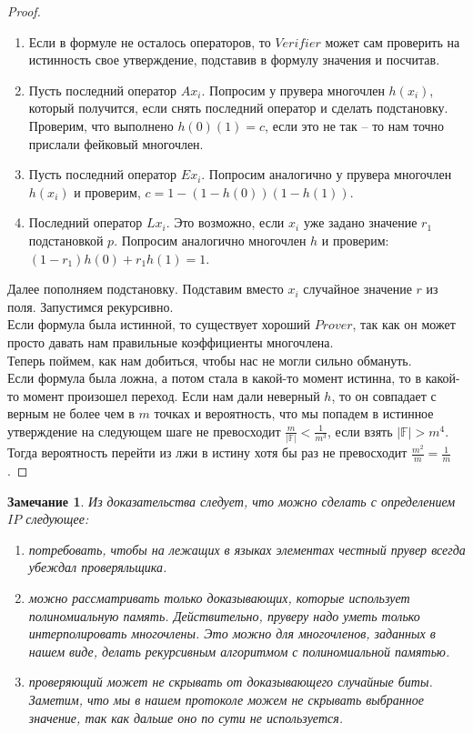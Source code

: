 \documentclass[12pt, letterpaper]{article}
\newtheorem{note}{Замечание}[section]
\newcommand{\Ff}{\mathbb{F}}
\begin{document}
\begin{proof}
\begin{enumerate}
\item Если в формуле не осталось операторов, то $Verifier$ может сам проверить на истинность свое утверждение, подставив в формулу значения и посчитав.
\item Пусть последний оператор $A x_i$. Попросим у прувера многочлен $h(x_i)$, который получится, если снять последний оператор и сделать подстановку. Проверим, что выполнено $h(0)(1)=c$, если это не так -- то нам точно прислали фейковый многочлен. 
\item Пусть последний оператор $E x_i$. Попросим аналогично у прувера многочлен $h(x_i)$ и проверим, $c = 1 - (1-h(0))(1-h(1))$.
\item Последний оператор $Lx_i$. Это возможно, если $x_i$ уже задано значение $r_1$ подстановкой $p$. Попросим аналогично многочлен $h$ и проверим: $(1-r_1)h(0)+r_1h(1)=1$.
\end{enumerate}
Далее пополняем подстановку. Подставим вместо $x_i$ случайное значение $r$ из поля. Запустимся рекурсивно.\\
Если формула была истинной, то существует хороший $Prover$, так как он может просто давать нам правильные коэффициенты многочлена.\\
Теперь поймем, как нам добиться, чтобы нас не могли сильно обмануть.\\
Если формула была ложна, а потом стала в какой-то момент истинна, то в какой-то момент произошел переход. Если нам дали неверный $h$, то он совпадает с верным не более чем в $m$ точках и вероятность, что мы попадем в истинное утверждение на следующем шаге не превосходит $\frac{m}{|\Ff|} < \frac{1}{m^3}$, если взять $|\Ff| > m^4$. Тогда вероятность перейти из лжи в истину хотя бы раз не превосходит $\frac{m^2}{m} = \frac{1}{m}$.
\end{proof}

\begin{note}
Из доказательства следует, что можно сделать с определением $IP$ следующее:
\begin{enumerate}
\item потребовать, чтобы на лежащих в языках элементах честный прувер всегда убеждал проверяльщика.
\item можно рассматривать только доказывающих, которые использует полиномиальную память. Действительно, пруверу надо уметь только интерполировать многочлены. Это можно для многочленов, заданных в нашем виде, делать рекурсивным алгоритмом с полиномиальной памятью.
\item проверяющий может не скрывать от доказывающего случайные биты. Заметим, что мы в нашем протоколе можем не скрывать выбранное значение, так как дальше оно по сути не используется.
\end{enumerate}
\end{note}
\end{document}
